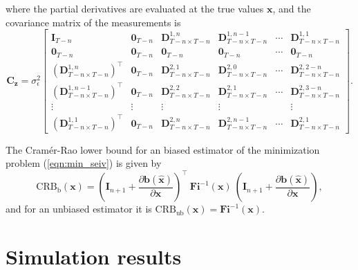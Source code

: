 where the partial derivatives are evaluated at the true values $\mathbf{x}$, and the covariance matrix of the measurements is
\begin{equation} \mathbf{C}_{\mathbf{z}} = \sigma_{\epsilon}^2 \begin{bmatrix} \mathbf{I}_{T-n} & \mathbf{0}_{T-n} & \mathbf{D}_{T-n \times T-n}^{1,n} & \mathbf{D}_{T-n \times T-n}^{1,n-1} & \cdots & \mathbf{D}_{T-n \times T-n}^{1,1} \\ \mathbf{0}_{T-n} & \mathbf{0}_{T-n} & \mathbf{0}_{T-n} & \mathbf{0}_{T-n} & \cdots & \mathbf{0}_{T-n} \\ \left( \mathbf{D}_{T-n \times T-n}^{1,n} \right)^\top & \mathbf{0}_{T-n} & \mathbf{D}_{T-n \times T-n}^{2,1} & \mathbf{D}_{T-n \times T-n}^{2,0} & \cdots & \mathbf{D}_{T-n \times T-n}^{2,2-n} \\ \left( \mathbf{D}_{T-n \times T-n}^{1,n-1} \right)^\top & \mathbf{0}_{T-n} & \mathbf{D}_{T-n \times T-n}^{2,2} & \mathbf{D}_{T-n \times T-n}^{2,1} & \cdots & \mathbf{D}_{T-n \times T-n}^{2,3-n} \\ \vdots & \vdots & \vdots & \vdots & & \vdots \\ \left( \mathbf{D}_{T-n \times T-n}^{1,1} \right)^\top & \mathbf{0}_{T-n} & \mathbf{D}_{T-n \times T-n}^{2,n} & \mathbf{D}_{T-n \times T-n}^{2,n-1} & \cdots & \mathbf{D}_{T-n \times T-n}^{2,1} \end{bmatrix} .
 \label{eqn:Cz} \end{equation} 

The Cram\'er-Rao lower bound for an biased estimator of the minimization problem (\ref{eqn:min_seiv}) is given by
\begin{equation} \mathrm{CRB}_{\mathrm{b}}(\mathbf{x}) = \left( \mathbf{I}_{n+1} + \frac{\partial \mathbf{b} \left( \widehat{\mathbf{x}} \right) }{\partial \mathbf{x} } \right)^\top \ \mathbf{Fi}^{-1}(\mathbf{x}) \ \left( \mathbf{I}_{n+1} + \frac{\partial \mathbf{b} \left( \widehat{\mathbf{x}} \right) }{\partial \mathbf{x} } \right), \label{eqn:CRB_EIV} \end{equation} 
and for an unbiased estimator it is $\mathrm{CRB}_{\mathrm{ub}}(\mathbf{x}) = \mathbf{Fi}^{-1}(\mathbf{x})$.


\section{Simulation results}

